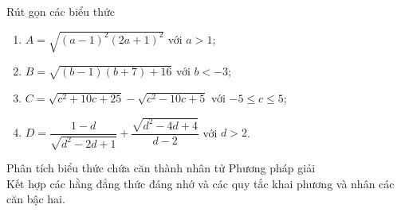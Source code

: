 \begin{vd}
	Rút gọn các biểu thức
	\begin{enumerate}
		\item $A=\sqrt{(a-1)^2(2a+1)^2}$ với $a>1$;
		\item $B=\sqrt{(b-1)(b+7)+16}$ với $b<-3$;
		\item $C=\sqrt{c^2+10c+25}-\sqrt{c^2-10c+5}$ với $-5\le c\le 5$;
		\item $D=\dfrac{1-d}{\sqrt{d^2-2d+1}}+\dfrac{\sqrt{d^2-4d+4}}{d-2}$ với $d>2$.
	\end{enumerate}
\end{vd}
   
\begin{dang}{Phân tích biểu thức chứa căn thành nhân tử}
	Phương pháp giải\\
	Kết hợp các hằng đẳng thức đáng nhớ và các quy tắc khai phương và nhân các căn bậc hai.
\end{dang}

